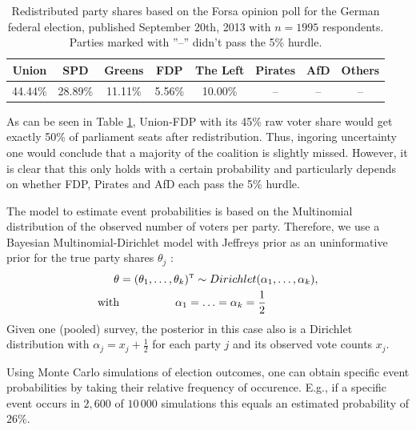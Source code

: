 \documentclass[smallcondensed]{svjour3}     %
\newcommand{\T}{\mathrm{\scriptscriptstyle T}}
\begin{document}
\begin{table}[!ht]\centering
\caption{Redistributed party shares based on the Forsa opinion poll for the German federal election, published September 20th, 2013 with $n=1995$ respondents. Parties marked with ''--'' didn't pass the 5\% hurdle.
\label{bauer:tab_fdp_redist}
}
\medskip
\begin{tabular}{cccccccc}
\toprule[0.09 em]
Union & SPD & Greens & FDP & The Left & Pirates & AfD & Others \\
\midrule
44.44\% & 28.89\% & 11.11\% & 5.56\% & 10.00\% & -- & -- & -- \\
\bottomrule[0.09 em]
\end{tabular}
\end{table}

As can be seen in Table \ref{bauer:tab_fdp_redist}, Union-FDP with its 45\% raw voter share would get exactly 50\% of parliament seats after redistribution. Thus, ingoring uncertainty one would conclude that a majority of the coalition is slightly missed. However, it is clear that this only holds with a certain probability and particularly depends on whether FDP, Pirates and AfD each pass the 5\% hurdle.

The model to estimate event probabilities is based on the Multinomial distribution of the observed
number of voters per party. Therefore, we use a Bayesian Multinomial-Dirichlet model
with Jeffreys prior as an uninformative prior for the true party shares
$\theta_j$ \citep{gelman_2013}:
\begin{equation}
\begin{aligned}
\boldmath{\theta} &= (\theta_1,\ldots,\theta_k)^\T \sim Dirichlet(\alpha_1,\ldots,\alpha_k), \\
\text{with} &\ \ \ \ \ \ \ \ \ \ \ \ \ \ \ \alpha_1 = \ldots = \alpha_k = \frac{1}{2}
\end{aligned}
\end{equation}
Given one (pooled) survey, the posterior in this case also is a Dirichlet distribution
with $\alpha_j = x_j + \frac{1}{2}$ for each party $j$ and its observed
vote counts $x_j$.

Using Monte Carlo simulations of election outcomes, one can obtain
specific event probabilities by taking their relative frequency of
occurence. E.g., if a specific event occurs in $2,600$ of $10\,000$
simulations this equals an estimated probability of $26\%$.
\end{document}
